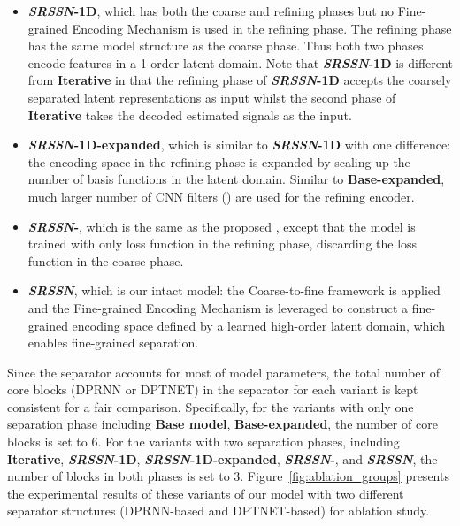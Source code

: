 \begin{itemize}
    \item \textbf{\emph{SRSSN}-1D}, which has both the coarse and refining phases but no Fine-grained Encoding Mechanism is used in the refining phase. The refining phase has the same model structure as the coarse phase. Thus both two phases encode features in a 1-order latent domain. Note that \textbf{\emph{SRSSN}-1D} is different from \textbf{Iterative} in that the refining phase of \textbf{\emph{SRSSN}-1D} accepts the coarsely separated latent representations as input whilst the second phase of \textbf{Iterative} takes the decoded estimated signals as the input.
    \item \textbf{\emph{SRSSN}-1D-expanded}, which is similar to \textbf{\emph{SRSSN}-1D} with one difference: the encoding space in the refining phase is expanded by scaling up the number of basis functions in the latent domain. Similar to \textbf{Base-expanded}, much larger number of CNN filters () are used for the refining encoder.
\item \textbf{\emph{SRSSN}-}, which is the same as the proposed , except that the model is trained with only loss function  in the refining phase, discarding the loss function  in the coarse phase. 
    \item \textbf{\emph{SRSSN}}, which is our intact model: the Coarse-to-fine framework is applied and the Fine-grained Encoding Mechanism is leveraged to construct a fine-grained encoding space defined by a learned high-order latent domain, which enables fine-grained separation.
\end{itemize}
Since the separator accounts for most of model parameters, the total number of core blocks (DPRNN or DPTNET) in the separator for each variant is kept consistent for a fair comparison. Specifically, for the variants with only one separation phase including \textbf{Base model}, \textbf{Base-expanded},  the number of core blocks  is set to 6. For the variants with two separation phases, including \textbf{Iterative}, \textbf{\emph{SRSSN}-1D}, \textbf{\emph{SRSSN}-1D-expanded}, \textbf{\emph{SRSSN}-}, and \textbf{\emph{SRSSN}}, the number of blocks  in both phases is set to 3. Figure~\ref{fig:ablation_groups} presents the experimental results of these  variants of our model with two different separator structures (DPRNN-based and DPTNET-based) for ablation study.




